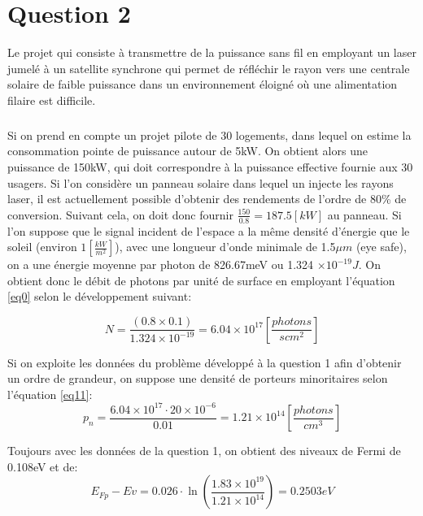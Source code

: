 \chapter{Question 2}

Le projet qui consiste à transmettre de la puissance sans fil en employant un laser jumelé à un satellite synchrone qui permet de réfléchir le rayon vers une centrale solaire de faible puissance dans un environnement éloigné où une alimentation filaire est difficile. 

\paragraph{}Si on prend en compte un projet pilote de 30 logements, dans lequel on estime la consommation pointe de puissance autour de 5kW. On obtient alors une puissance de 150kW, qui doit correspondre à la puissance effective fournie aux 30 usagers. Si l'on considère un panneau solaire dans lequel un injecte les rayons laser, il est actuellement possible d'obtenir des rendements de l'ordre de 80\% de conversion. Suivant cela, on doit donc fournir $\frac{150}{0.8} = 187.5 \left[kW\right]$ au panneau. Si l'on suppose que le signal incident de l'espace a la même densité d'énergie que le soleil (environ $1\left[\frac{kW}{m^2}\right]$), avec une longueur d'onde minimale de 1.5$\mu m$ (eye safe), on a une énergie moyenne par photon de 826.67meV ou 1.324 $\times 10^{-19} J$. On obtient donc le débit de photons par unité de surface en employant l'équation \ref{eq0} selon le développement suivant:

\begin{equation}
N = \frac{(0.8 \times 0.1)}{1.324\times 10^{-19}} = 6.04\times 10^{17} \left[\frac{photons}{s cm^2}\right]
\end{equation}

Si on exploite les données du problème développé à la question 1 afin d'obtenir un ordre de grandeur, on suppose une densité de porteurs minoritaires selon l'équation \ref{eq11}:
\begin{equation}
p_n = \frac{6.04\times 10^{17} \cdot 20 \times 10^{-6}}{0.01} = 1.21\times 10^{14}\left[\frac{photons}{cm^3}\right]
\end{equation}

Toujours avec les données de la question 1, on obtient des niveaux de Fermi de 0.108eV et de:
\begin{equation}
E_{Fp} - Ev = 0.026\cdot\ln\left(\frac{1.83\times 10^{19}}{1.21\times 10^{14}}\right) = 0.2503eV
\end{equation}

